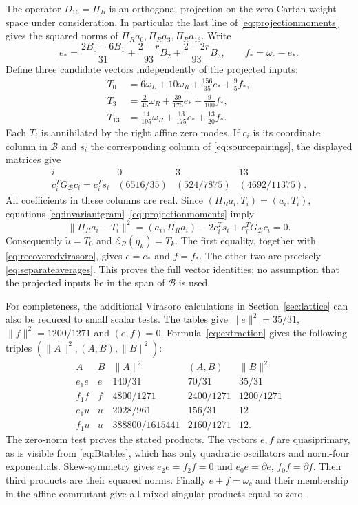 \documentclass[11pt,reqno]{amsart}
\theoremstyle{definition}\newtheorem{definition}[theorem]{Definition}
\theoremstyle{remark}\newtheorem{remark}[theorem]{Remark}
\numberwithin{equation}{section}
\begin{document}
The operator $D_{16}=\Pi_R$ is an orthogonal projection on the zero-Cartan-weight space under consideration. In particular the last line of \eqref{eq:projectionmoments} gives the squared norms of $\Pi_Ra_0,\Pi_Ra_3,\Pi_Ra_{13}$. Write
\[
 e_*=\frac{2B_0+6B_1}{31}+\frac{2-r}{93}B_2+\frac{2-2r}{93}B_3,
 \qquad f_*=\omega_c-e_*.
\]
Define three candidate vectors independently of the projected inputs:
\begin{align*}
 T_0&=6\omega_L+10\omega_R+\tfrac{156}{35}e_*+\tfrac95f_*,\\
 T_3&=\tfrac2{45}\omega_R+\tfrac{39}{175}e_*+\tfrac9{100}f_*,\\
 T_{13}&=\tfrac{14}{195}\omega_R+\tfrac{13}{175}e_*+\tfrac{13}{20}f_*.
\end{align*}
Each $T_i$ is annihilated by the right affine zero modes. If $c_i$ is its coordinate column in $\mathcal B$ and $s_i$ the corresponding column of \eqref{eq:sourcepairings}, the displayed matrices give
\[
\begin{array}{c|ccc}
 i&0&3&13\\\hline
 c_i^TG_{\mathcal B}c_i=c_i^Ts_i&(6516/35)&(524/7875)&(4692/11375).
\end{array}
\]
All coefficients in these columns are real. Since $(\Pi_Ra_i,T_i)=(a_i,T_i)$, equations \eqref{eq:invariantgram}--\eqref{eq:projectionmoments} imply
\[
 \|\Pi_Ra_i-T_i\|^2=(a_i,\Pi_Ra_i)-2c_i^Ts_i+c_i^TG_{\mathcal B}c_i=0.
\]
Consequently $\widetilde u=T_0$ and $\mathcal E_R(\eta_k)=T_k$. The first equality, together with \eqref{eq:recoveredvirasoro}, gives $e=e_*$ and $f=f_*$. The other two are precisely \eqref{eq:separateaverages}. This proves the full vector identities; no assumption that the projected inputs lie in the span of $\mathcal B$ is used.

For completeness, the additional Virasoro calculations in Section~\ref{sec:lattice} can also be reduced to small scalar tests. The tables give $\|e\|^2=35/31$, $\|f\|^2=1200/1271$ and $(e,f)=0$. Formula~\eqref{eq:extraction} gives the following triples $(\|A\|^2,(A,B),\|B\|^2)$:
\[
\begin{array}{c|c|ccc}
 A&B&\|A\|^2&(A,B)&\|B\|^2\\\hline
 e_1e&e&140/31&70/31&35/31\\
 f_1f&f&4800/1271&2400/1271&1200/1271\\
 e_1u&u&2028/961&156/31&12\\
 f_1u&u&388800/1615441&2160/1271&12.
\end{array}
\]
The zero-norm test proves the stated products. The vectors $e,f$ are quasiprimary, as is visible from \eqref{eq:Btables}, which has only quadratic oscillators and norm-four exponentials. Skew-symmetry gives $e_2e=f_2f=0$ and $e_0e=\partial e$, $f_0f=\partial f$. Their third products are their squared norms. Finally $e+f=\omega_c$ and their membership in the affine commutant give all mixed singular products equal to zero.
\end{document}
